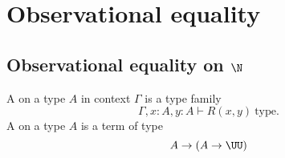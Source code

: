 \chapter{Observational equality}

\section{Observational equality on $\N$}

\begin{defn}
A  on a type $A$ in context $\Gamma$ is a type family
\begin{equation*}
\Gamma,x:A,y:A\vdash R(x,y)~\mathrm{type}.
\end{equation*}
A  on a type $A$ is a term of type
\begin{equation*}
A\to (A\to\UU)
\end{equation*}
\end{defn}

